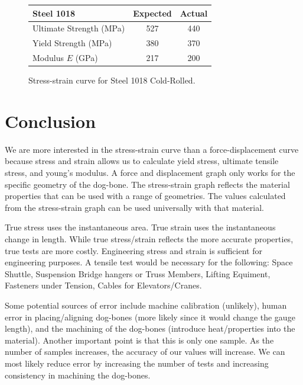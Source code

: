 \documentclass[conf]{new-aiaa} %
\begin{document}
\begin{figure}[h!]
\begin{minipage}{0.48\textwidth}
    \caption{Stress-strain curve for Steel 1018 Cold-Rolled.}
    \label{fig:steel}
    \vspace{2em}
    \renewcommand{\arraystretch}{1.3}
    \begin{tabular}{lcc}
    \toprule
    \textbf{Steel 1018} & Expected & Actual \\
    \midrule
    Ultimate Strength (MPa) & 527 & 440 \\ 
    Yield Strength (MPa)    & 380 & 370 \\ 
    Modulus $E$ (GPa)       & 217 & 200 \\ 
    \bottomrule
    \end{tabular}
    \label{tab:steel}
\end{minipage}

\end{figure}

\section{Conclusion}
We are more interested in the stress-strain curve than a force-displacement curve because stress and strain allows us to calculate yield stress, ultimate tensile stress, and young's modulus.
A force and displacement graph only works for the specific geometry of the dog-bone.
The stress-strain graph reflects the material properties that can be used with a range of geometries.
The values calculated from the stress-strain graph can be used universally with that material.

True stress uses the instantaneous area.
True strain uses the instantaneous change in length.
While true stress/strain reflects the more accurate properties, true tests are more costly.
Engineering stress and strain is sufficient for engineering purposes.
A tensile test would be necessary for the following: Space Shuttle, Suspension Bridge hangers or Truss Members, Lifting Equiment, Fasteners under Tension, Cables for Elevators/Cranes.

Some potential sources of error include machine calibration (unlikely), human error in placing/aligning dog-bones (more likely since it would change the gauge length), and the machining of the dog-bones (introduce heat/properties into the material).
Another important point is that this is only one sample.
As the number of samples increases, the accuracy of our values will increase.
We can most likely reduce error by increasing the number of tests and increasing consistency in machining the dog-bones.


% 
% 
\end{document}
